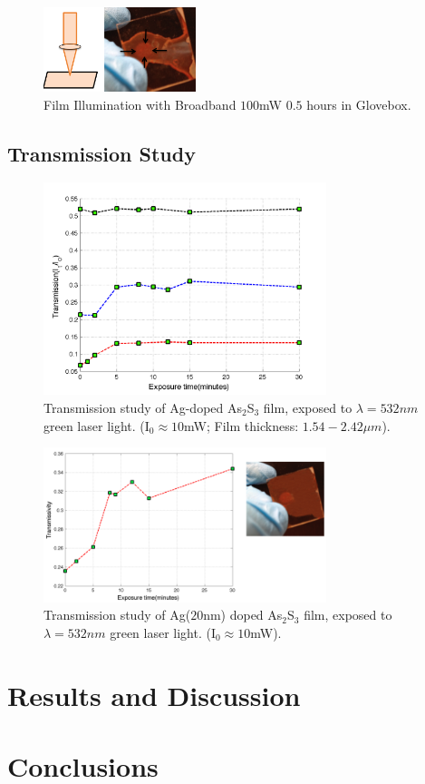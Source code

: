 \documentclass[twocolumn,showpacs,preprintnumbers,amsmath,amssymb]{revtex4}
\begin{document}
\begin{figure}[!h]
  \includegraphics[width=1.75in]{Exposure2.png}
  \caption{Film Illumination with Broadband $100$mW $0.5$ hours in Glovebox.}
  \label{fig:setup}
\end{figure}

\subsection{Transmission Study}
\begin{figure}[!h]
  \includegraphics[width=3.25in]{Transmission.png}
  \caption{Transmission study of Ag-doped As$_2$S$_3$ film, exposed to
    $\lambda = 532nm$ green laser light.
    (I$_0 \approx 10$mW; Film thickness: $1.54-2.42 \mu m$).
}
  \label{fig:setup}
\end{figure}

\begin{figure}[!h]
  \includegraphics[width=3.25in]{Transmission20nm.png}
  \caption{Transmission study of Ag($20$nm) doped As$_2$S$_3$ film, exposed to
    $\lambda = 532nm$ green laser light.
    (I$_0 \approx 10$mW).}
  \label{fig:setup}
\end{figure}


\section{Results and Discussion}
\section{Conclusions}

\end{document}
